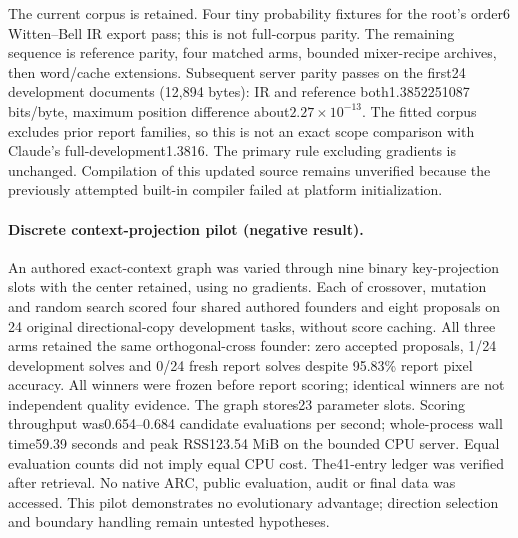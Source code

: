 \documentclass[11pt]{article}
\begin{document}
The current corpus is retained. Four tiny probability fixtures for the root's
order6 Witten--Bell IR export pass; this is not full-corpus parity. The remaining
sequence is reference parity, four matched arms, bounded mixer-recipe archives,
then word/cache extensions. Subsequent server parity passes on the first24
development documents (12{,}894 bytes): IR and reference both1.3852251087
bits/byte, maximum position difference about$2.27\times10^{-13}$.
The fitted corpus excludes prior report families, so this is not an exact scope
comparison with Claude's full-development1.3816. The primary rule excluding
gradients is unchanged.
Compilation of this updated source remains unverified because the previously
attempted built-in compiler failed at platform initialization.
\paragraph{Discrete context-projection pilot (negative result).}
An authored exact-context graph was varied through nine binary key-projection
slots with the center retained, using no gradients. Each of crossover, mutation
and random search scored four shared authored founders and eight proposals on
24 original directional-copy development tasks, without score caching. All
three arms retained the same orthogonal-cross founder: zero accepted proposals,
1/24 development solves and 0/24 fresh report solves despite 95.83\% report
pixel accuracy. All winners were frozen before report scoring; identical
winners are not independent quality evidence. The graph stores23 parameter
slots. Scoring throughput was0.654--0.684 candidate evaluations per second;
whole-process wall time59.39 seconds and peak RSS123.54 MiB on the bounded CPU
server. Equal evaluation counts did not imply equal CPU cost. The41-entry
ledger was verified after retrieval. No native ARC, public evaluation, audit or
final data was accessed. This pilot demonstrates no evolutionary advantage;
direction selection and boundary handling remain untested hypotheses.
\end{document}
